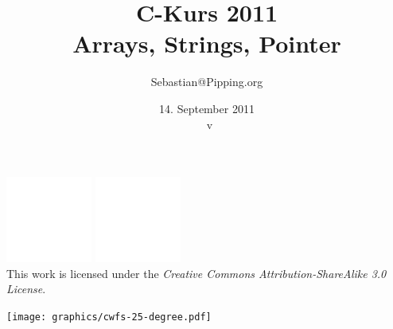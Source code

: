 \documentclass{beamer}
\title{C-Kurs 2011\\Arrays, Strings, Pointer}
\author{Sebastian@Pipping.org}
\date{14. September 2011\\{\tiny~v\vspace*{-5ex}}}
\newcommand{\CcLongnameBySa}{Attribution-ShareAlike}
\newcommand{\CcImageBy}[1]{%
	\includegraphics[scale=#1]{creative-commons/cc-by-white.pdf}%
}
\newcommand{\CcImageSa}[1]{%
	\includegraphics[scale=#1]{creative-commons/cc-sa-white.pdf}%
}
\newcommand{\CcNote}[1]{%
	This work is licensed under the \textit{Creative Commons #1 3.0 License}.%
}
\newcommand{\CcGroupBySa}[2]{%
	\CcImageBy{#1}\hspace*{#2}\CcImageSa{#1}%
}
\begin{document}

\begin{frame}
	\titlepage
	\vfill
	\begin{center}
		\CcGroupBySa{0.33}{0.95ex}\\[2.5ex]
		{\tiny\CcNote{\CcLongnameBySa}}
		\vspace*{13ex}
	\end{center}
	\vspace*{-5ex}
	\vspace*{-0.5\textheight}\hspace*{0.65\textwidth}\texttt{[image: graphics/cwfs-25-degree.pdf]}
\end{frame}


\end{document}
